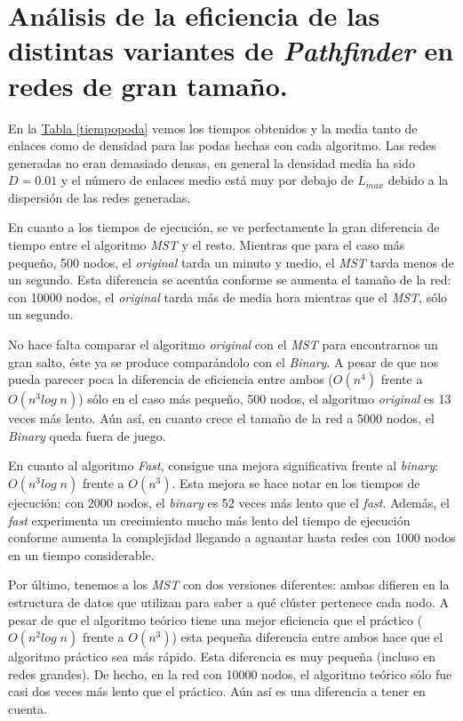 \documentclass[10pt,a4paper,spanish]{article}
\numberwithin{equation}{section} %
\numberwithin{figure}{section} %
\numberwithin{table}{section} %
\begin{document}
\section{Análisis de la eficiencia de las distintas variantes de \textit{Pathfinder} en redes de gran tamaño.}
En la \hyperref[tiempopoda]{Tabla \ref*{tiempopoda}} vemos los tiempos obtenidos y la media tanto de enlaces como de densidad para las podas hechas con cada algoritmo. Las redes generadas no eran demasiado densas, en general la densidad media ha sido $D = 0.01$ y el número de enlaces medio está muy por debajo de $L_{max}$ debido a la dispersión de las redes generadas.

En cuanto a los tiempos de ejecución, se ve perfectamente la gran diferencia de tiempo entre el algoritmo \textit{MST} y el resto. Mientras que para el caso más pequeño, 500 nodos, el \textit{original} tarda un minuto y medio, el \textit{MST} tarda menos de un segundo. Esta diferencia se acentúa conforme se aumenta el tamaño de la red: con 10000 nodos, el \textit{original} tarda más de media hora mientras que el \textit{MST}, sólo un segundo. 

No hace falta comparar el algoritmo \textit{original} con el \textit{MST} para encontrarnos un gran salto, éste ya se produce comparándolo con el \textit{Binary}. A pesar de que nos pueda parecer poca la diferencia de eficiencia entre ambos ($O(n^4)$ frente a $O(n^3 log\; n)$) sólo en el caso más pequeño, 500 nodos, el algoritmo \textit{original} es 13 veces más lento. Aún así, en cuanto crece el tamaño de la red a 5000 nodos, el \textit{Binary} queda fuera de juego.

En cuanto al algoritmo \textit{Fast}, consigue una mejora significativa frente al \textit{binary}: $O(n^3 log\; n)$ frente a $O(n^3)$. Esta mejora se hace notar en los tiempos de ejecución: con 2000 nodos, el \textit{binary} es 52 veces más lento que el \textit{fast}. Además, el \textit{fast} experimenta un crecimiento mucho más lento del tiempo de ejecución conforme aumenta la complejidad llegando a aguantar hasta redes con 1000 nodos en un tiempo considerable. 

Por último, tenemos a los \textit{MST} con dos versiones diferentes: ambas difieren en la estructura de datos que utilizan para saber a qué clúster pertenece cada nodo. A pesar de que el algoritmo teórico tiene una mejor eficiencia que el práctico ($O(n^2 log\;n)$ frente a $O(n^3)$) esta pequeña diferencia entre ambos hace que el algoritmo práctico sea más rápido. Esta diferencia es muy pequeña (incluso en redes grandes). De hecho, en la red con 10000 nodos, el algoritmo teórico sólo fue casi dos veces más lento que el práctico. Aún así es una diferencia a tener en cuenta.
\end{document}
